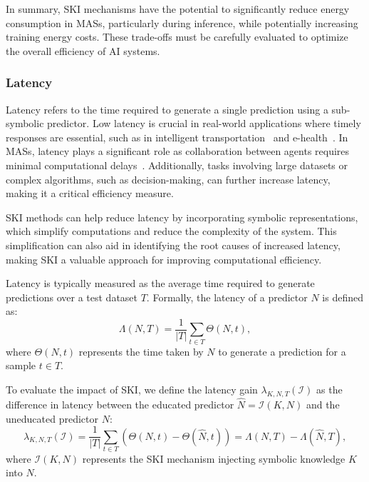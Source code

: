 %
In summary, \gls{SKI} mechanisms have the potential to significantly reduce energy consumption in \glspl{MAS}, particularly during inference, while potentially increasing training energy costs.
%
These trade-offs must be carefully evaluated to optimize the overall efficiency of \gls{AI} systems.


\subsubsection{Latency}\label{subsubsec:ski-meets-intelligent-agents-latency}
%
Latency refers to the time required to generate a single prediction using a sub-symbolic predictor.
%
Low latency is crucial in real-world applications where timely responses are essential, such as in intelligent transportation~\cite{CITATION} and e-health~\cite{CITATION}.
%
In \glspl{MAS}, latency plays a significant role as collaboration between agents requires minimal computational delays~\cite{CITATION}.
%
Additionally, tasks involving large datasets or complex algorithms, such as decision-making, can further increase latency, making it a critical efficiency measure.

%
\gls{SKI} methods can help reduce latency by incorporating symbolic representations, which simplify computations and reduce the complexity of the system.
%
This simplification can also aid in identifying the root causes of increased latency, making \gls{SKI} a valuable approach for improving computational efficiency.

%
Latency is typically measured as the average time required to generate predictions over a test dataset \(T\).
%
Formally, the latency of a predictor \(N\) is defined as:
%
\begin{equation}
    \label{eq:latency}
    \Lambda(N, T) = \frac{1}{\vert T \vert} \sum_{t \in T} \Theta(N, t),
\end{equation}
%
where \(\Theta(N, t)\) represents the time taken by \(N\) to generate a prediction for a sample \(t \in T\).

%
To evaluate the impact of \gls{SKI}, we define the latency gain $\lambda_{K, N, T}(\mathcal{I})$ as the difference in latency between the educated predictor \(\hat{N} = \mathcal{I}(K, N)\) and the uneducated predictor \(N\):
%
\begin{equation}
    \label{eq:latency-gain}
    \lambda_{K, N, T}(\mathcal{I}) = \frac{1}{\vert T \vert} \sum_{t \in T} \left( \Theta(N, t) - \Theta(\hat{N}, t) \right) = \Lambda(N, T) - \Lambda(\hat{N}, T),
\end{equation}
%
where \(\mathcal{I}(K, N)\) represents the \gls{SKI} mechanism injecting symbolic knowledge \(K\) into \(N\).

